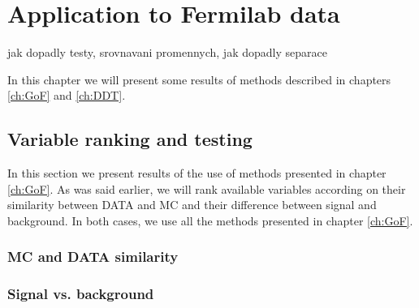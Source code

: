 \chapter{Application to Fermilab data}
jak dopadly testy, srovnavani promennych, jak dopadly separace

\noindent In this chapter we will present some results of methods described in chapters \ref{ch:GoF} and \ref{ch:DDT}. 

\section{Variable ranking and testing}
In this section we present results  of the use of methods presented in chapter \ref{ch:GoF}. As was said earlier, we will rank available variables according on their similarity between DATA and MC and their difference between signal and background. In both cases, we use all the methods presented in chapter \ref{ch:GoF}.  

\subsection{MC and DATA similarity}

\subsection{Signal vs. background}

